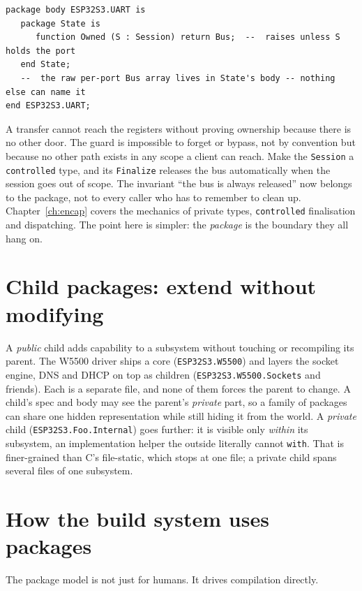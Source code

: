 \begin{lstlisting}
package body ESP32S3.UART is
   package State is
      function Owned (S : Session) return Bus;  --  raises unless S holds the port
   end State;
   --  the raw per-port Bus array lives in State's body -- nothing else can name it
end ESP32S3.UART;
\end{lstlisting}

\noindent
A transfer cannot reach the registers without proving ownership because there is no
other door. The guard is impossible to forget or bypass, not by convention but
because no other path exists in any scope a client can reach. Make the
\texttt{Session} a \texttt{controlled} type, and its \texttt{Finalize} releases the
bus automatically when the session goes out of scope. The invariant ``the bus is
always released'' now belongs to the package, not to every caller who has to remember
to clean up. Chapter~\ref{ch:encap} covers the mechanics of private types,
\texttt{controlled} finalisation and dispatching. The point here is simpler: the
\emph{package} is the boundary they all hang on.

\section{Child packages: extend without modifying}

A \emph{public} child adds capability to a subsystem without touching or recompiling
its parent. The W5500 driver ships a core (\texttt{ESP32S3.W5500}) and layers the
socket engine, DNS and DHCP on top as children (\texttt{ESP32S3.W5500.Sockets} and
friends). Each is a separate file, and none of them forces the parent to change. A
child's spec and body may see the parent's \emph{private} part, so a family of
packages can share one hidden representation while still hiding it from the world. A
\emph{private} child (\texttt{ESP32S3.Foo.Internal}) goes further: it is visible only
\emph{within} its subsystem, an implementation helper the outside literally cannot
\texttt{with}. That is finer-grained than C's file-static, which stops at one file; a
private child spans several files of one subsystem.

\section{How the build system uses packages}

The package model is not just for humans. It drives compilation directly.

